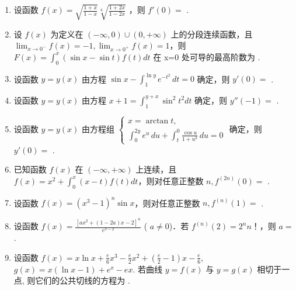 \documentclass[12pt, a4paper]{ctexart}
\begin{document}
\begin{enumerate}[start=21]
    \item 设函数 $ f(x)=\sqrt{\frac{1+x}{1-x}}\sqrt[4]{\frac{1+2x}{1-2x}} $ ，则 $ f'(0)= $ \underline{\hspace{2cm}}.

    \item 设 $ f(x) $ 为定义在 $ (-\infty,0) \cup (0,+\infty) $ 上的分段连续函数，且 $ \lim_{x\to0^-}f(x)=-1,\lim_{x\to0^+}f(x)=1 $，则 $ F(x)=\int_{0}^{x}(\sin x-\sin t)f(t)dt $ 在 x=0 处可导的最高阶数为 \underline{\hspace{2cm}}.

    \item 设函数 $ y = y(x) $ 由方程 $ \sin x - \int_{1}^{\ln y} e^{-t^{2}} \, dt = 0 $ 确定，则 $ y'(0) = $ \underline{\hspace{2cm}}.

    \item 设函数 $ y = y(x) $ 由方程 $ x + 1 = \int_{1}^{y+x} \sin^{2} t^{2} dt $ 确定，则 $ y''(-1) = $ \underline{\hspace{2cm}}.

    \item 设函数 $ y = y(x) $ 由方程组 $ \begin{cases} x = \arctan t, \\ \int_{0}^{2y} e^u \, du + \int_{t}^{0} \frac{\cos u}{1 + u^2} \, du = 0 \end{cases} $ 确定，则 $ y'(0) = $ \underline{\hspace{2cm}}.

    \item 已知函数 $ f(x) $ 在 $ (-\infty, +\infty) $ 上连续，且 $ f(x) = x^{2} + \int_{0}^{x}(x-t)f(t)dt $，则对任意正整数 $ n, f^{(2n)}(0) = $ \underline{\hspace{2cm}}.

    \item 设函数 $ f(x)=\left(x^{3}-1\right)^{n}\sin x $，则对任意正整数 $ n,f^{(n)}(1)= $ \underline{\hspace{2cm}}.

    \item 设函数 $ f(x) = \frac{\left[ax^{2} + (1 - 2a)x - 2\right]^{n}}{e^{x - 2}} $ ( $ a \neq 0 $)．若 $ f^{(n)}(2) = 2^{n}n $！，则 $ a = $ \underline{\hspace{2cm}}.

    \item 设函数 $ f(x) = x \ln x + \frac{e}{6} x^3 - \frac{e}{2} x^2 + \left( \frac{e}{2} - 1 \right) x - \frac{e}{6} $, $ g(x) = x (\ln x - 1) + e^x - ex $. 若曲线 $ y = f(x) $ 与 $ y = g(x) $ 相切于一点, 则它们的公共切线的方程为 \underline{\hspace{2cm}}.


\end{enumerate}
\end{document}
